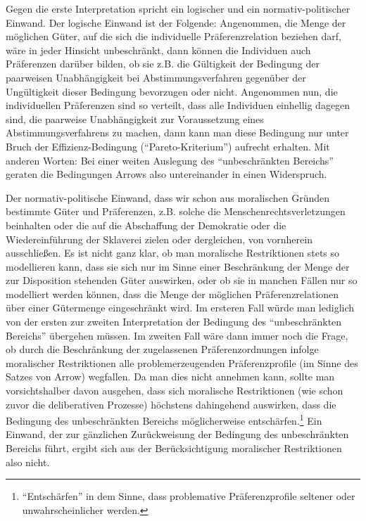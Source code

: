 Gegen die erste Interpretation spricht ein logischer und ein
normativ-politischer Einwand. Der logische Einwand ist der Folgende:
Angenommen, die Menge der möglichen Güter, auf die sich die individuelle
Präferenzrelation beziehen darf, wäre in jeder Hinsicht unbeschränkt, dann
können die Individuen auch Präferenzen darüber bilden, ob sie z.B. die
Gültigkeit der Bedingung der paarweisen Unabhängigkeit bei Abstimmungsverfahren
gegenüber der Ungültigkeit dieser Bedingung bevorzugen oder nicht. Angenommen
nun, die individuellen Präferenzen sind so verteilt, dass alle Individuen
einhellig dagegen sind, die paarweise Unabhängigkeit zur Voraussetzung
eines Abstimmungsverfahrens zu machen, dann kann man diese Bedingung nur unter
Bruch der Effizienz-Bedingung ("`Pareto-Kriterium"') aufrecht erhalten. Mit
anderen Worten: Bei einer weiten Auslegung des "`unbeschränkten Bereichs"'
geraten die Bedingungen Arrows also untereinander in einen Widerspruch.

Der normativ-politische Einwand, dass wir schon aus moralischen
Gründen bestimmte Güter und Präferenzen, z.B. solche
die Menschenrechtsverletzungen beinhalten oder
die auf die Abschaffung der Demokratie oder die Wiedereinführung der Sklaverei
zielen oder dergleichen, von vornherein ausschließen. Es ist nicht ganz klar, ob
man moralische Restriktionen stets so modellieren kann, dass sie sich nur im
Sinne einer Beschränkung der Menge der zur Disposition stehenden Güter auswirken,
oder ob sie in manchen Fällen nur so modelliert werden können, dass die Menge der
möglichen Präferenzrelationen über einer Gütermenge eingeschränkt wird. Im
ersteren Fall würde man lediglich von der ersten zur zweiten Interpretation der
Bedingung des "`unbeschränkten Bereichs"' übergehen müssen. Im zweiten Fall wäre
dann immer noch die Frage, ob durch die Beschränkung der zugelassenen
Präferenzordnungen infolge moralischer Restriktionen alle problemerzeugenden
Präferenzprofile (im Sinne des Satzes von Arrow) wegfallen. Da man dies nicht
annehmen kann, sollte man vorsichtshalber davon ausgehen, dass sich moralische
Restriktionen (wie schon zuvor die deliberativen Prozesse) höchstens dahingehend
auswirken, dass die Bedingung des unbeschränkten Bereichs möglicherweise
entschärfen.\footnote{"`Entschärfen"' in dem Sinne, dass problemative
Präferenzprofile seltener oder unwahrscheinlicher werden.} Ein Einwand, der zur
gänzlichen Zurückweisung der Bedingung des unbeschränkten Bereichs führt, ergibt
sich aus der Berücksichtigung moralischer Restriktionen also nicht. 

